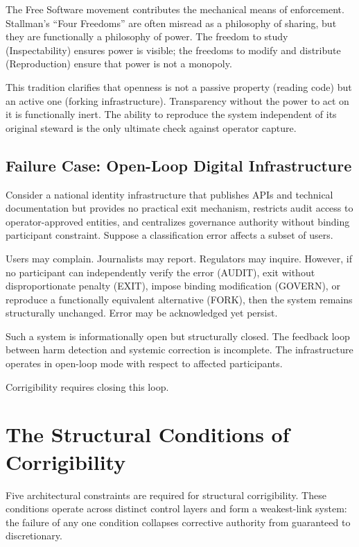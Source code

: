 \documentclass{article}
\begin{document}
The Free Software movement \citep{stallman2002} contributes the mechanical means of enforcement. Stallman's ``Four Freedoms'' are often misread as a philosophy of sharing, but they are functionally a philosophy of power. The freedom to study (Inspectability) ensures power is visible; the freedoms to modify and distribute (Reproduction) ensure that power is not a monopoly.

This tradition clarifies that openness is not a passive property (reading code) but an active one (forking infrastructure). Transparency without the power to act on it is functionally inert. The ability to reproduce the system independent of its original steward is the only ultimate check against operator capture.

\subsection{Failure Case: Open-Loop Digital Infrastructure}
\label{subsec:failure-case}

Consider a national identity infrastructure that publishes APIs and technical documentation but provides no practical exit mechanism, restricts audit access to operator-approved entities, and centralizes governance authority without binding participant constraint. Suppose a classification error affects a subset of users.

Users may complain. Journalists may report. Regulators may inquire. However, if no participant can independently verify the error (AUDIT), exit without disproportionate penalty (EXIT), impose binding modification (GOVERN), or reproduce a functionally equivalent alternative (FORK), then the system remains structurally unchanged. Error may be acknowledged yet persist.

Such a system is informationally open but structurally closed. The feedback loop between harm detection and systemic correction is incomplete. The infrastructure operates in open-loop mode with respect to affected participants.

Corrigibility requires closing this loop.

\section{The Structural Conditions of Corrigibility}
\label{sec:tests}

Five architectural constraints are required for structural corrigibility. These conditions operate across distinct control layers and form a weakest-link system: the failure of any one condition collapses corrective authority from guaranteed to discretionary.
\end{document}
